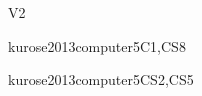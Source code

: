 \begin{syllabus}
\begin{competences}{V2}
    \item {}
    \item {}
    \item {}
    \item {}
    \item {}
    \item {}
    \item {}
\end{competences}

\begin{unit}{\NCIntroduction}{}{kurose2013computer}{5}{C1,CS8}
\begin{topics}%
    \item \NCIntroductionTopicOrganization
    \item \NCIntroductionTopicSwitching
    \item \NCIntroductionTopicPhysical
    \item \NCIntroductionTopicLayering
    \item \NCIntroductionTopicRoles
\end{topics}
\begin{learningoutcomes}
    \item \NCIntroductionLOArticulateThe [\Familiarity]
    \item \NCIntroductionLOListAndAppropriate [\Familiarity]
    \item \NCIntroductionLODescribeTheOfNetworked [\Familiarity]
      \item \NCIntroductionLOIdentifyTheOfA [\Familiarity]
\end{learningoutcomes}
\end{unit}

\begin{unit}{\NCNetworkedApplications}{}{kurose2013computer}{5}{CS2,CS5}
\begin{topics}%
    \item \NCNetworkedApplicationsTopicNaming
    \item \NCNetworkedApplicationsTopicDistributed
    \item \NCNetworkedApplicationsTopicHttp
    \item \NCNetworkedApplicationsTopicMultiplexing
    \item \NCNetworkedApplicationsTopicSocket
\end{topics}
\begin{learningoutcomes}
	\item \NCNetworkedApplicationsLOListTheThe [\Familiarity]
	\item \NCNetworkedApplicationsLODefineTheNaming [\Familiarity]
	\item \NCNetworkedApplicationsLOImplementAServer [\Usage]
\end{learningoutcomes}
\end{unit}


\end{syllabus}
